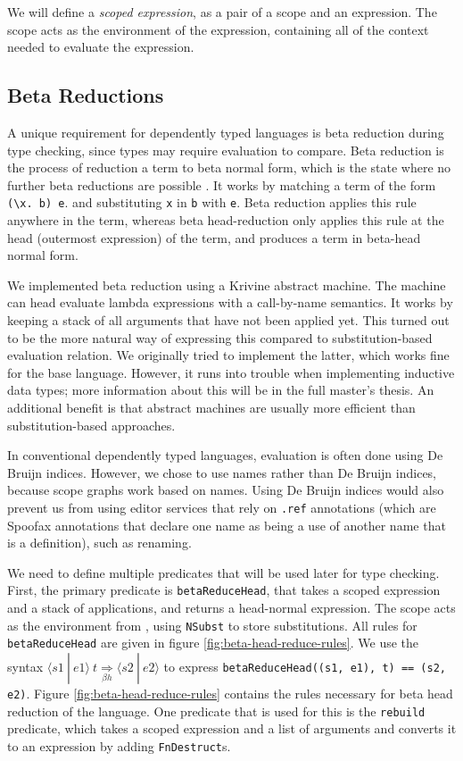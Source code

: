 \documentclass[a4paper,UKenglish,cleveref, autoref, thm-restate]{oasics-v2021}
\newcommand{\scope}[2]{\langle#1 \: | \: #2\rangle}
\newcommand{\bhr}[3]{ #1 \: #2 \underset{\beta h}{\Rightarrow} #3 }
\begin{document}
We will define a \emph{scoped expression}, as a pair of a scope and an expression. The scope acts as the environment of the expression, containing all of the context needed to evaluate the expression. 

\subsection{Beta Reductions}
\label{sec:coc-dynsyms}

A unique requirement for dependently typed languages is beta reduction during type checking, since types may require evaluation to compare. Beta reduction is the process of reduction a term to beta normal form, which is the state where no further beta reductions are possible \cite{tapl}. It works by matching a term of the form \verb|(\x. b) e|. and substituting \verb|x| in \verb|b| with \verb|e|. Beta reduction applies this rule anywhere in the term, whereas beta head-reduction only applies this rule at the head (outermost expression) of the term, and produces a term in beta-head normal form. 

We implemented beta reduction using a Krivine abstract machine\cite{krivine}. The machine can head evaluate lambda expressions with a call-by-name semantics. It works by keeping a stack of all arguments that have not been applied yet. This turned out to be the more natural way of expressing this compared to substitution-based evaluation relation. We originally tried to implement the latter, which works fine for the base language. However, it runs into trouble when implementing inductive data types; more information about this will be in the full master's thesis\cite{thesis}. An additional benefit is that abstract machines are usually more efficient than substitution-based approaches.

In conventional dependently typed languages, evaluation is often done using De Bruijn indices. However, we chose to use names rather than De Bruijn indices, because scope graphs work based on names. Using De Bruijn indices would also prevent us from using editor services that rely on \verb|.ref| annotations (which are Spoofax annotations that declare one name as being a use of another name that is a definition), such as renaming.

We need to define multiple predicates that will be used later for type checking. First, the primary predicate is \verb|betaReduceHead|, that takes a scoped expression and a stack of applications, and returns a head-normal expression. The scope acts as the environment from \cite{krivine}, using \verb|NSubst| to store substitutions. All rules for \verb|betaReduceHead| are given in figure \ref{fig:beta-head-reduce-rules}. We use the syntax $\bhr{\scope{s1}{e1}}{t}{\scope{s2}{e2}}$ to express \verb|betaReduceHead((s1, e1), t) == (s2, e2)|. Figure \ref{fig:beta-head-reduce-rules} contains the rules necessary for beta head reduction of the language. One predicate that is used for this is the \verb|rebuild| predicate, which takes a scoped expression and a list of arguments and converts it to an expression by adding \verb|FnDestruct|s.
\end{document}
